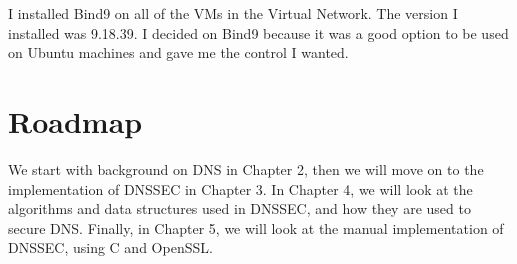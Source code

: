 I installed Bind9 on all of the VMs in the Virtual Network. The version I installed was 9.18.39. I decided on Bind9 because it was a good option to be used on Ubuntu machines and gave me the control I wanted.

\section{Roadmap}

We start with background on DNS in Chapter 2, then we will move on to the implementation of DNSSEC in Chapter 3. In Chapter 4, we will look at the algorithms and data structures used in DNSSEC, 
and how they are used to secure DNS. Finally, in Chapter 5, we will look at the manual implementation of DNSSEC, using C and OpenSSL.
